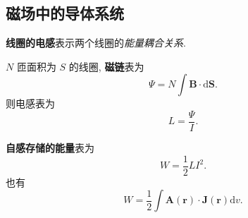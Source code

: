 \subsection{磁场中的导体系统}
\textbf{线圈的电感}表示两个线圈的\textit{能量耦合关系}.

$N$ 匝面积为 $S$ 的线圈, \textbf{磁链}表为
\begin{equation}
    \varPsi=N\int\bm{B}\cdot\mathrm{d}\bm{S}.
\end{equation}
则电感表为
\begin{equation}
    L=\frac{\varPsi}{I}.
\end{equation}

\textbf{自感存储的能量}表为
\begin{equation}
    W=\frac{1}{2}LI^2.
\end{equation}
也有
\begin{equation}
    W=\frac{1}{2}\int\bm{A}(\bm{r})\cdot\bm{J}(\bm{r})\mathrm{d}v.
\end{equation}

